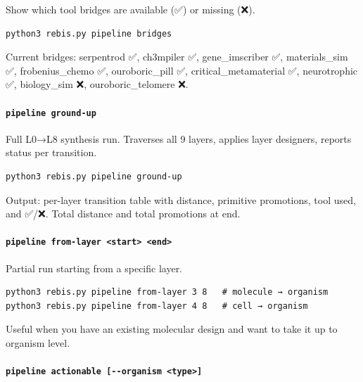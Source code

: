Show which tool bridges are available (✅) or missing (❌).

\begin{verbatim}
python3 rebis.py pipeline bridges
\end{verbatim}

Current bridges: serpentrod ✅, ch3mpiler ✅, gene\_imscriber ✅,
materials\_sim ✅, frobenius\_chemo ✅, ouroboric\_pill ✅,
critical\_metamaterial ✅, neurotrophic ✅, biology\_sim ❌,
ouroboric\_telomere ❌.

\hypertarget{pipeline-ground-up}{%
\paragraph{\texorpdfstring{\texttt{pipeline\ ground-up}}{pipeline ground-up}}\label{pipeline-ground-up}}

Full L0→L8 synthesis run. Traverses all 9 layers, applies layer
designers, reports status per transition.

\begin{verbatim}
python3 rebis.py pipeline ground-up
\end{verbatim}

Output: per-layer transition table with distance, primitive promotions,
tool used, and ✅/❌. Total distance and total promotions at end.

\hypertarget{pipeline-from-layer-start-end}{%
\paragraph{\texorpdfstring{\texttt{pipeline\ from-layer\ \textless{}start\textgreater{}\ \textless{}end\textgreater{}}}{pipeline from-layer \textless start\textgreater{} \textless end\textgreater{}}}\label{pipeline-from-layer-start-end}}

Partial run starting from a specific layer.

\begin{verbatim}
python3 rebis.py pipeline from-layer 3 8   # molecule → organism
python3 rebis.py pipeline from-layer 4 8   # cell → organism
\end{verbatim}

Useful when you have an existing molecular design and want to take it up
to organism level.

\hypertarget{pipeline-actionable---organism-type}{%
\paragraph{\texorpdfstring{\texttt{pipeline\ actionable\ {[}-\/-organism\ \textless{}type\textgreater{}{]}}}{pipeline actionable {[}-\/-organism \textless type\textgreater{]}}}\label{pipeline-actionable---organism-type}}


